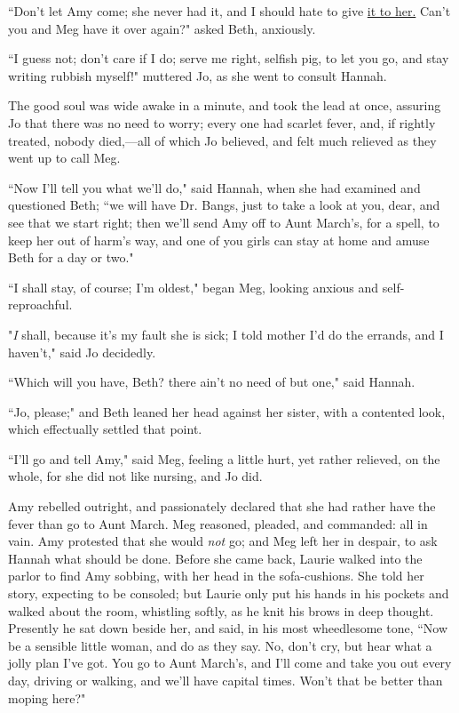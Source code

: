 ``Don't let Amy come; she never had it, and I should hate
to give \underline{it to her.} Can't you and Meg have it over
again?" asked Beth, anxiously.

``I guess not; don't care if I do; serve me right,
selfish pig, to let you go, and stay writing rubbish myself!" muttered
Jo, as she went to consult Hannah.

The good soul was wide awake in a minute, and took the lead at once,
assuring Jo that there was no need to worry; every one had scarlet
fever, and, if rightly treated, nobody died,---all of which Jo believed,
and felt much relieved as they went up to call Meg.

``Now I'll tell you what we'll do," said
Hannah, when she had examined and questioned Beth; ``we will have Dr.
Bangs, just to take a look at you, dear, and see that we start right;
then we'll send Amy off to Aunt March's,
for a spell, to keep her out of harm's way, and one of
you girls can stay at home and amuse Beth for a day or two."

``I shall stay, of course; I'm oldest," began Meg,
looking anxious and self-reproachful.

"\emph{I} shall, because it's my fault she is sick; I
told mother I'd do the errands, and I
haven't," said Jo decidedly.

``Which will you have, Beth? there ain't no need of but
one," said Hannah.

``Jo, please;" and Beth leaned her head against her sister, with a
contented look, which effectually settled that point.

``I'll go and tell Amy," said Meg, feeling a little hurt,
yet rather relieved, on the whole, for she did not like nursing, and Jo
did.

Amy rebelled outright, and passionately declared that she had rather
have the fever than go to Aunt March. Meg reasoned, pleaded, and
commanded: all in vain. Amy protested that she would \emph{not} go; and
Meg left her in despair, to ask Hannah what should be done. Before she
came back, Laurie walked into the parlor to find Amy sobbing, with her
head in the sofa-cushions. She told her story, expecting to be consoled;
but Laurie only put his hands in his pockets and walked about the room,
whistling softly, as he knit his brows in deep thought. Presently he sat
down beside her, and said, in his most wheedlesome tone, ``Now be a
sensible little woman, and do as they say. No, don't
cry, but hear what a jolly plan I've got. You go to Aunt
March's, and I'll come and take you out
every day, driving or walking, and we'll have capital
times. Won't that be better than moping here?"

